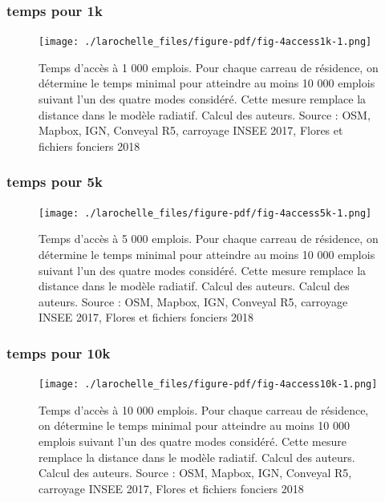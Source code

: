 \documentclass[
  10pt,
  a4paper,
  numbers=noendperiod,
  DIV=9]{scrreprt}
\begin{document}
\hypertarget{temps-pour-1k}{%
\subsubsection{temps pour 1k}\label{temps-pour-1k}}

\begin{figure}[htb]

{\centering \texttt{[image: ./larochelle\_files/figure-pdf/fig-4access1k-1.png]}

}

\caption[Accessibilité à 1 000 emplois pour la
Rochelle]{\label{fig-4access1k}Temps d'accès à 1 000 emplois. Pour
chaque carreau de résidence, on détermine le temps minimal pour
atteindre au moins 10 000 emplois suivant l'un des quatre modes
considéré. Cette mesure remplace la distance dans le modèle radiatif.
Calcul des auteurs. Source : OSM, Mapbox, IGN, Conveyal R5, carroyage
INSEE 2017, Flores et fichiers fonciers 2018}

\end{figure}

\hypertarget{temps-pour-5k}{%
\subsubsection{temps pour 5k}\label{temps-pour-5k}}

\begin{figure}[htb]

{\centering \texttt{[image: ./larochelle\_files/figure-pdf/fig-4access5k-1.png]}

}

\caption[Accessibilité à 5 000 emplois pour la
Rochelle]{\label{fig-4access5k}Temps d'accès à 5 000 emplois. Pour
chaque carreau de résidence, on détermine le temps minimal pour
atteindre au moins 10 000 emplois suivant l'un des quatre modes
considéré. Cette mesure remplace la distance dans le modèle radiatif.
Calcul des auteurs. Calcul des auteurs. Source : OSM, Mapbox, IGN,
Conveyal R5, carroyage INSEE 2017, Flores et fichiers fonciers 2018}

\end{figure}

\hypertarget{temps-pour-10k}{%
\subsubsection{temps pour 10k}\label{temps-pour-10k}}

\begin{figure}[htb]

{\centering \texttt{[image: ./larochelle\_files/figure-pdf/fig-4access10k-1.png]}

}

\caption[Accessibilité à 10 000 emplois pour la
Rochelle]{\label{fig-4access10k}Temps d'accès à 10 000 emplois. Pour
chaque carreau de résidence, on détermine le temps minimal pour
atteindre au moins 10 000 emplois suivant l'un des quatre modes
considéré. Cette mesure remplace la distance dans le modèle radiatif.
Calcul des auteurs. Calcul des auteurs. Source : OSM, Mapbox, IGN,
Conveyal R5, carroyage INSEE 2017, Flores et fichiers fonciers 2018}

\end{figure}
\end{document}

